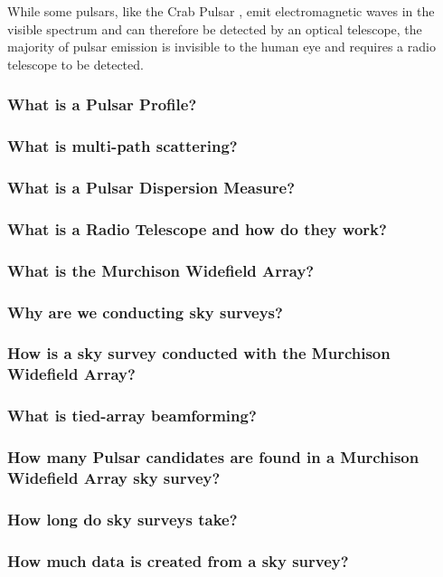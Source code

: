 \documentclass{article}
\begin{document}
While some pulsars, like the Crab Pulsar \autocite{maoz}, emit electromagnetic waves in the visible spectrum and can therefore be detected by an optical telescope, the majority of pulsar emission is invisible to the human eye and requires a radio telescope to be detected.

\subsubsection{What is a Pulsar Profile?}
\subsubsection{What is multi-path scattering?}
\subsubsection{What is a Pulsar Dispersion Measure?}
\subsubsection{What is a Radio Telescope and how do they work?}
\subsubsection{What is the Murchison Widefield Array?}
\subsubsection{Why are we conducting sky surveys?}
\subsubsection{How is a sky survey conducted with the Murchison Widefield Array?}
\subsubsection{What is tied-array beamforming?}
\subsubsection{How many Pulsar candidates are found in a Murchison Widefield Array sky survey?}
\subsubsection{How long do sky surveys take?}
\subsubsection{How much data is created from a sky survey?}
\end{document}
